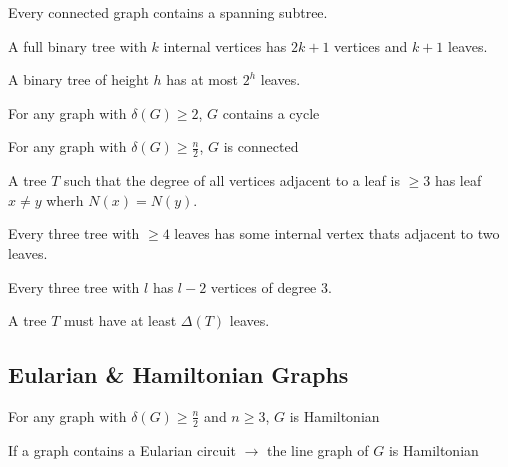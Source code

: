 \begin{theorem}
	Every connected graph contains a spanning subtree.
\end{theorem}

\begin{theorem}
	A full binary tree with $k$ internal vertices has $2k+1$ vertices and $k+1$ leaves.
\end{theorem}

\begin{theorem}
	A binary tree of height $h$ has at most $2^h$ leaves.
\end{theorem}


\begin{theorem}
	For any graph with $\delta(G)\geq 2$, $G$ contains a cycle
\end{theorem}

\begin{theorem}
	For any graph with $\delta(G)\geq \frac{n}{2}$, $G$ is connected
\end{theorem}

\begin{theorem}
	A tree $T$ such that the degree of all vertices adjacent to a leaf is $\geq 3$ has leaf $x\neq y$ wherh $N(x) = N(y)$.
\end{theorem}

\begin{theorem}
	Every three tree with $\geq 4$ leaves has some internal vertex thats adjacent to two leaves.
\end{theorem}

\begin{theorem}
 Every three tree with $l$ has $l-2$ vertices of degree $3$.
\end{theorem}

\begin{theorem}
	A tree $T$ must have at least $\Delta(T)$ leaves.
\end{theorem}


\subsection*{Eularian \& Hamiltonian Graphs}
\begin{corollary}
	For any graph with $\delta(G)\geq \frac{n}{2}$ and $n\geq 3$, $G$ is Hamiltonian
\end{corollary}

\begin{theorem}
	If a graph contains a Eularian circuit $\rightarrow$ the line graph of $G$ is Hamiltonian
\end{theorem}

